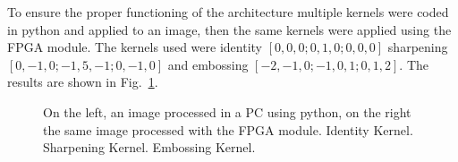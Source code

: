 \documentclass[conference,compsoc]{IEEEtran}
\begin{document}
To ensure the proper functioning of the architecture multiple kernels were
coded in python and applied to an image, then the same kernels were applied using
the FPGA module. The kernels used were identity $[0, 0, 0; 0, 1, 0; 0, 0, 0]$
sharpening $[0, -1, 0; -1, 5, -1; 0, -1, 0]$ and embossing $[-2, -1, 0; -1, 0,
1; 0, 1, 2]$. The results are shown in Fig.~\ref{images_py_po}.

\begin{figure}[!t]
\centering
{}
\hfil
{}
\hfil
{}
\caption{On the left, an image processed in a PC using python, on the right the
  same image processed with the FPGA module. \protect{}
  Identity Kernel. \protect{} Sharpening Kernel.
  \protect{} Embossing Kernel.}
\label{images_py_po}
\end{figure}
\end{document}
